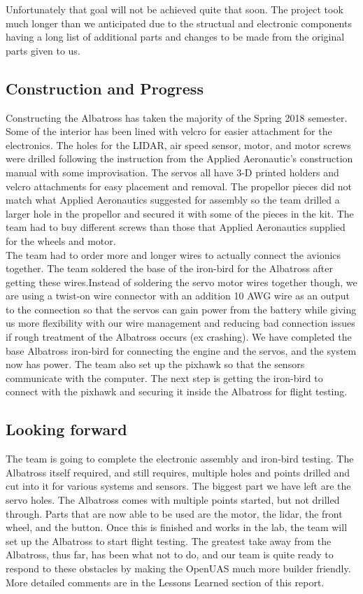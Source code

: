 ﻿\documentclass{article}
\begin{document}
\noindent Unfortunately that goal will not be achieved quite that soon. The project took much longer than we anticipated due to the structual and electronic components having a long list of additional parts and changes to be made from the original parts given to us. 

\subsection{Construction and Progress}
\noindent Constructing the Albatross has taken the majority of the Spring 2018 semester. Some of the interior has been lined with velcro for easier attachment for the electronics. The holes for the LIDAR, air speed sensor, motor, and motor screws were drilled following the instruction from the Applied Aeronautic's construction manual with some improvisation. The servos all have 3-D printed holders and velcro attachments for easy placement and removal. The propellor pieces did not match what Applied Aeronautics suggested for assembly so the team drilled a larger hole in the propellor and secured it with some of the pieces in the kit. The team had to buy different screws than those that Applied Aeronautics supplied for the wheels and motor. \\
  
\noindent The team had to order more and longer wires to actually connect the avionics together. The team soldered the base of the iron-bird for the Albatross after getting these wires.Instead of soldering the servo motor wires together though, we are using a twist-on wire connector with an addition 10 AWG wire as an output to the connection so that the servos can gain power from the battery while giving us more flexibility with our wire management and reducing bad connection issues if rough treatment of the Albatross occurs (ex crashing). We have completed the base Albatross iron-bird for connecting the engine and the servos, and the system now has power. The team also set up the pixhawk so that the sensors communicate with the computer. The next step is getting the iron-bird to connect with the pixhawk and securing it inside the Albatross for flight testing. \\
  
\subsection{Looking forward}
\noindent The team is going to complete the electronic assembly and iron-bird testing. The Albatross itself required, and still requires, multiple holes and points drilled and cut into it for various systems and sensors. The biggest part we have left are the servo holes. The Albatross comes with multiple points started, but not drilled through. Parts that are now able to be used are the motor, the lidar, the front wheel, and the button. Once this is finished and works in the lab, the team will set up the Albatross to start flight testing. The greatest take away from the Albatross, thus far, has been what not to do, and our team is quite ready to respond to these obstacles by making the OpenUAS much more builder friendly. More detailed comments are in the Lessons Learned section of this report.
\end{document}
